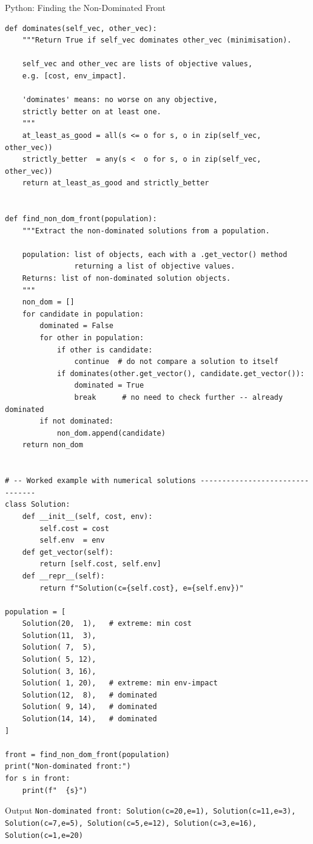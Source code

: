 \documentclass[aspectratio=169,10pt]{beamer}
\begin{document}
\begin{frame}[fragile]{Python: Finding the Non-Dominated Front}
\begin{lstlisting}
def dominates(self_vec, other_vec):
    """Return True if self_vec dominates other_vec (minimisation).

    self_vec and other_vec are lists of objective values,
    e.g. [cost, env_impact].

    'dominates' means: no worse on any objective,
    strictly better on at least one.
    """
    at_least_as_good = all(s <= o for s, o in zip(self_vec, other_vec))
    strictly_better  = any(s <  o for s, o in zip(self_vec, other_vec))
    return at_least_as_good and strictly_better


def find_non_dom_front(population):
    """Extract the non-dominated solutions from a population.

    population: list of objects, each with a .get_vector() method
                returning a list of objective values.
    Returns: list of non-dominated solution objects.
    """
    non_dom = []
    for candidate in population:
        dominated = False
        for other in population:
            if other is candidate:
                continue  # do not compare a solution to itself
            if dominates(other.get_vector(), candidate.get_vector()):
                dominated = True
                break      # no need to check further -- already dominated
        if not dominated:
            non_dom.append(candidate)
    return non_dom


# -- Worked example with numerical solutions --------------------------------
class Solution:
    def __init__(self, cost, env):
        self.cost = cost
        self.env  = env
    def get_vector(self):
        return [self.cost, self.env]
    def __repr__(self):
        return f"Solution(c={self.cost}, e={self.env})"

population = [
    Solution(20,  1),   # extreme: min cost
    Solution(11,  3),
    Solution( 7,  5),
    Solution( 5, 12),
    Solution( 3, 16),
    Solution( 1, 20),   # extreme: min env-impact
    Solution(12,  8),   # dominated
    Solution( 9, 14),   # dominated
    Solution(14, 14),   # dominated
]

front = find_non_dom_front(population)
print("Non-dominated front:")
for s in front:
    print(f"  {s}")
\end{lstlisting}
\begin{exampleblock}{Output}
\texttt{Non-dominated front: Solution(c=20,e=1), Solution(c=11,e=3),
Solution(c=7,e=5), Solution(c=5,e=12), Solution(c=3,e=16), Solution(c=1,e=20)}
\end{exampleblock}
\end{frame}
\end{document}
